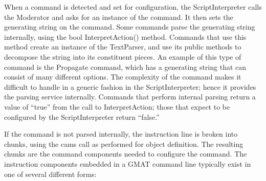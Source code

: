 When a command is detected and set for configuration, the ScriptInterpreter calls the Moderator
and asks for an instance of the command.  It then sets the generating string on the command.  Some
commands parse the generating string internally, using the bool InterpretAction() method.  Commands
that use this method create an instance of the TextParser, and use its public methods to decompose
the string into its constituent pieces.  An example of this type of command is the Propagate
command, which has a generating string that can consist of many different options.  The complexity
of the command makes it difficult to handle in a generic fashion in the ScriptInterpreter; hence it
provides the parsing service internally.  Commands that perform internal parsing return a value of
``true'' from the call to InterpretAction; those that expect to be configured by the
ScriptInterpreter return ``false.''

If the command is not parsed internally, the instruction line is broken into chunks, using the
cams call as performed for object definition.  The resulting chunks are the command components
needed to configure the command.  The instruction components embedded in a GMAT command line
typically exist in one of several different forms:

